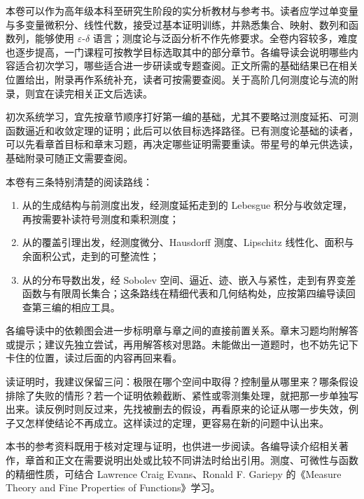本卷可以作为高年级本科至研究生阶段的实分析教材与参考书。读者应学过单变量与多变量微积分、线性代数，接受过基本证明训练，并熟悉集合、映射、数列和函数列，能够使用 \(\varepsilon\)-\(\delta\) 语言；测度论与泛函分析不作先修要求。全卷内容较多，难度也逐步提高，一门课程可按教学目标选取其中的部分章节。各编导读会说明哪些内容适合初次学习，哪些适合进一步研读或专题查阅。正文所需的基础结果已在相关位置给出，附录再作系统补充，读者可按需要查阅。关于高阶几何测度论与流的附录，则宜在读完相关正文后选读。

\ProseParagraphBreak

初次系统学习，宜先按章节顺序打好第一编的基础，尤其不要略过测度延拓、可测函数逼近和收敛定理的证明；此后可以依目标选择路径。已有测度论基础的读者，可以先看章首目标和章末习题，再决定哪些证明需要重读。带星号的单元供选读，基础附录可随正文需要查阅。

\ProseParagraphBreak

本卷有三条特别清楚的阅读路线：
\begin{enumerate}
\item 从的生成结构与前测度出发，经测度延拓走到的 Lebesgue 积分与收敛定理，再按需要补读符号测度和乘积测度；
\item 从的覆盖引理出发，经测度微分、Hausdorff 测度、Lipschitz 线性化、面积与余面积公式，走到的可整流性；
\item 从的分布导数出发，经 Sobolev 空间、逼近、迹、嵌入与紧性，走到有界变差函数与有限周长集合；这条路线在精细代表和几何结构处，应按第四编导读回查第三编的相应工具。
\end{enumerate}

各编导读中的依赖图会进一步标明章与章之间的直接前置关系。章末习题均附解答或提示；建议先独立尝试，再用解答核对思路。未能做出一道题时，也不妨先记下卡住的位置，读过后面的内容再回来看。

\ProseParagraphBreak

读证明时，我建议保留三问：极限在哪个空间中取得？控制量从哪里来？哪条假设排除了失败的情形？若一个证明依赖截断、紧性或零测集处理，就把那一步单独写出来。读反例时则反过来，先找被删去的假设，再看原来的论证从哪一步失效，例子又怎样使结论不再成立。这样读过的定理，更容易在新的问题中认出来。

\ProseParagraphBreak

本书的参考资料既用于核对定理与证明，也供进一步阅读。各编导读介绍相关著作，章首和正文在需要说明出处或比较不同讲法时给出引用。测度、可微性与函数的精细性质，可结合 Lawrence Craig Evans、Ronald F. Gariepy 的《Measure Theory and Fine Properties of Functions》\cite{Evans2015Measure}学习。

